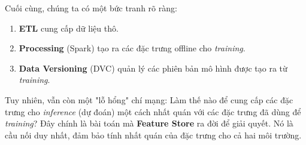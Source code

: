 \documentclass[11pt]{article}
\begin{document}
Cuối cùng, chúng ta có một bức tranh rõ ràng:
\begin{enumerate}
    \item \textbf{ETL} cung cấp dữ liệu thô.
    \item \textbf{Processing} (Spark) tạo ra các đặc trưng offline cho \textit{training}.
    \item \textbf{Data Versioning} (DVC) quản lý các phiên bản mô hình được tạo ra từ \textit{training}.
\end{enumerate}

Tuy nhiên, vẫn còn một "lỗ hổng" chí mạng: Làm thế nào để cung cấp các đặc trưng cho \textit{inference} (dự đoán) một cách nhất quán với các đặc trưng đã dùng để \textit{training}? Đây chính là bài toán mà \textbf{Feature Store} ra đời để giải quyết. Nó là cầu nối duy nhất, đảm bảo tính nhất quán của đặc trưng cho cả hai môi trường.
\end{document}
